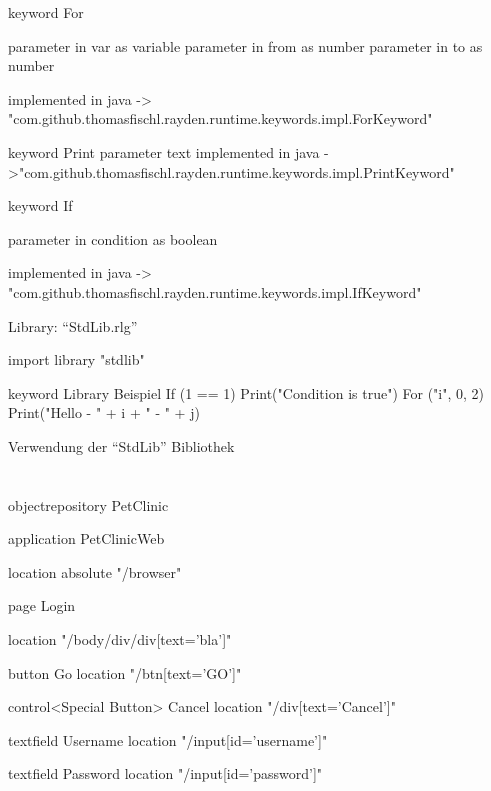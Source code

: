 \begin{program}
\begin{JavaCode}
keyword For { 
	parameter in var as variable
	parameter in from as number
	parameter in to as number

	implemented in java -> "com.github.thomasfischl.rayden.runtime.keywords.impl.ForKeyword"
}

keyword Print {
	parameter text
	implemented in java ->"com.github.thomasfischl.rayden.runtime.keywords.impl.PrintKeyword"
}

keyword If { 
	parameter in condition as boolean

	implemented in java -> "com.github.thomasfischl.rayden.runtime.keywords.impl.IfKeyword"
}
\end{JavaCode}
\caption{Library: "`StdLib.rlg"'}
\label{prog:or}
\end{program}

\begin{program}
\begin{JavaCode}
import library "stdlib"

keyword Library Beispiel {
	If (1 == 1){
		Print("Condition is true")
	}
	For ("i", 0, 2){
		Print("Hello - " + i + " - " + j)
	}
}
\end{JavaCode}
\caption{Verwendung der "`StdLib"' Bibliothek}
\label{prog:or}
\end{program}

\todo

\section{}


\begin{program}
\begin{JavaCode}

objectrepository PetClinic {

	application PetClinicWeb {
		location absolute "/browser"
		
		page Login {
			location "/body/div/div[text='bla']"
			
			button Go {
				location "/btn[text='GO']"
			}
			
			control<Special Button> Cancel {
				location "/div[text='Cancel']"
			}
		
			textfield Username {
				location  "/input[id='username']"
			}
			
			textfield Password {
				location  "/input[id='password']"
			}			
		} 
	}
}
\end{JavaCode}
\caption{}
\label{prog:or}
\end{program}

